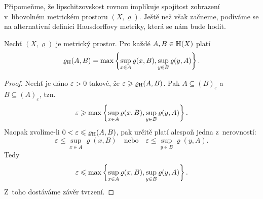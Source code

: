 Připomeňme, že lipschitzovskost rovnou implikuje spojitost zobrazení v~libovolném metrickém prostoru $(X,\varrho)$. Ještě než však začneme, podíváme se na alternativní definici Hausdorffovy metriky, která se nám bude hodit.
\begin{theorem}\label{thm:alternativni-hausdorffova-metrika}
    Nechť $(X,\varrho)$ je metrický prostor. Pro každé $A,B\in\mathbb{H}(X)$ platí
    \[\varrho_\textup{H}(A,B)=\max\left\{\sup_{x\in A}\varrho(x,B),\sup_{y\in B}\varrho(y,A)\right\}.\]
\end{theorem}
\begin{proof}
    Nechť je dáno $\varepsilon>0$ takové, že $\varepsilon\geqslant\varrho_\textup{H}(A,B)$. Pak $A\subseteq(B)_\varepsilon$ a~$B\subseteq(A)_\varepsilon$, tzn.
    \[\varepsilon\geqslant\max\left\{\sup_{x\in A}\varrho(x,B),\sup_{y\in B}\varrho(y,A)\right\}.\]
    Naopak zvolíme-li $0<\varepsilon\leqslant\varrho_\textup{H}(A,B)$, pak určitě platí alespoň jedna z~nerovností:
    \[\varepsilon\leqslant\sup_{x\in A}\varrho(x,B)\quad\text{nebo}\quad\varepsilon\leqslant\sup_{y\in B}\varrho(y,A).\]
    Tedy
    \[\varepsilon\leqslant\max\left\{\sup_{x\in A}\varrho(x,B),\sup_{y\in B}\varrho(y,A)\right\}.\]
    Z~toho dostáváme závěr tvrzení.
\end{proof}

